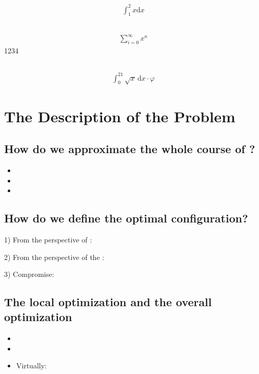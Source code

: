 \documentclass{apmcmthesis}
\begin{document}
\begin{align*}
  \int^2_1 x \mathrm{d} x
\end{align*}

\subsection{}
\begin{align}
  \sum_{i=0}^\infty x^n
\end{align}
1234
\subsection{}

\begin{align}
  \int_0^{21} \sqrt{x} \, \mathrm{d}x \cdot \varphi
\end{align}

\subsection{}


\section{The Description of the Problem}
\subsection{How do we approximate the whole course of ?}

\begin{itemize}
  \item
  \item
  \item
\end{itemize}


\subsection{How do we define the optimal configuration?}
1) From the perspective of      :\par
2) From the perspective of the      :\par
3) Compromise:

\subsection{The local optimization and the overall optimization}


\begin{itemize}
  \item
  \item
  \item Virtually:
\end{itemize}
\end{document}
